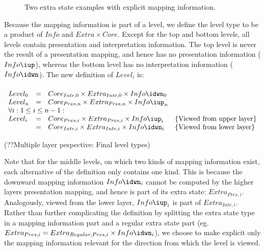 \begin{figure}
\begin{center}
\begin{center}
\end{center}
\caption{Two extra state examples with explicit mapping information.}\label{coreExtraInfoExamples} 
\end{center}
\end{figure}

Because the mapping information is part of a level, we define the level type to be a product of $Info$ and 
$Extra \times Core$. Except for the top and bottom levels, all levels contain presentation and interpretation information. The top level is never the result of a presentation mapping, and hence has no presentation information ($Info\iup$), whereas the bottom level has no interpretation information ($Info\idwn$). The new definition of $Level_i$ is:

\begin{small}\begin{align*}%
\end{align*} 
\(\begin{array}{lcll}
Level_{0} & = & Core_{Intr,0} \times Extra_{Intr,0} \times Info\idwn_{0} \\
Level_{n} & = & Core_{Pres,n} \times Extra_{Pres,n} \times  Info\iup_{n}\\
\lefteqn{\forall i:1 \le i \le n-1:}  \\
Level_{i} & = & Core_{Pres,i} \times Extra_{Pres,i}  \times Info\iup_{i} & \text{\{Viewed from upper layer\}}\\  
               & = & Core_{Intr,i} \times Extra_{Intr,i} \times Info\idwn_{i} & \text{\{Viewed from lower layer\}}
\end{array}\)\end{small}
\begin{center}(??Multiple layer pespective: Final level types)\end{center}\vspace{1em}

Note that for the middle levels, on which two kinds of mapping information exist, each alternative of the definition only contains one kind. This is because the downward mapping information $Info\idwn_{i}$ cannot be computed by the higher layers presentation mapping, and hence is part of its extra state: $Extra_{Pres,i}$. Analogously, viewed from the lower layer, $Info\iup_{i}$ is part of $Extra_{Intr,i}$. Rather than further complicating the definition by splitting the extra state type in a mapping information part and a regular extra state part (eg. $Extra_{Pres,i} = Extra_{Regular,Pres,i} \times Info\idwn_{i}$), we choose to make explicit only the mapping information relevant for the direction from which the level is viewed.

